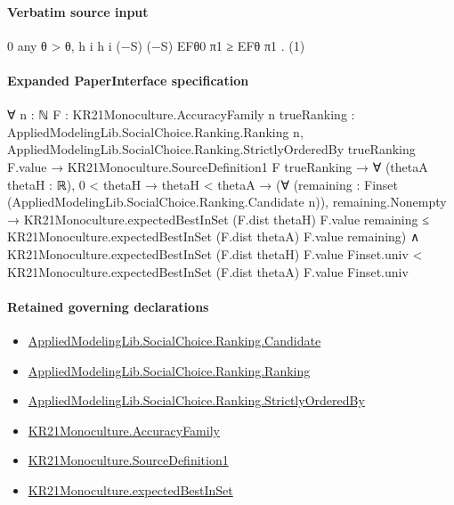 \documentclass[10pt]{article}
\begin{document}
\paragraph{Verbatim source input}
\begin{ReviewVerbatim}
0
any θ > θ,
h
i
h
i
(−S)
(−S)
EFθ0 π1
≥ EFθ π1
.
(1)
\end{ReviewVerbatim}



\paragraph{Expanded PaperInterface specification}
\begin{ReviewVerbatim}
∀ {n : ℕ} {F : KR21Monoculture.AccuracyFamily n} {trueRanking : AppliedModelingLib.SocialChoice.Ranking.Ranking n},
  AppliedModelingLib.SocialChoice.Ranking.StrictlyOrderedBy trueRanking F.value →
    KR21Monoculture.SourceDefinition1 F trueRanking →
      ∀ (thetaA thetaH : ℝ),
        0 < thetaH →
          thetaH < thetaA →
            (∀ (remaining : Finset (AppliedModelingLib.SocialChoice.Ranking.Candidate n)),
                remaining.Nonempty →
                  KR21Monoculture.expectedBestInSet (F.dist thetaH) F.value remaining ≤
                    KR21Monoculture.expectedBestInSet (F.dist thetaA) F.value remaining) ∧
              KR21Monoculture.expectedBestInSet (F.dist thetaH) F.value Finset.univ <
                KR21Monoculture.expectedBestInSet (F.dist thetaA) F.value Finset.univ
\end{ReviewVerbatim}

\paragraph{Retained governing declarations}
\begin{itemize}\raggedright
\item \hyperlink{library-prerequisite-8c0e6c25845ae78a}{Applied\allowbreak{}Modeling\allowbreak{}Lib.\allowbreak{}Social\allowbreak{}Choice.\allowbreak{}Ranking.\allowbreak{}Candidate}
\item \hyperlink{library-prerequisite-5cde54446d1ae021}{Applied\allowbreak{}Modeling\allowbreak{}Lib.\allowbreak{}Social\allowbreak{}Choice.\allowbreak{}Ranking.\allowbreak{}Ranking}
\item \hyperlink{library-prerequisite-3585717d1635654a}{Applied\allowbreak{}Modeling\allowbreak{}Lib.\allowbreak{}Social\allowbreak{}Choice.\allowbreak{}Ranking.\allowbreak{}Strictly\allowbreak{}Ordered\allowbreak{}By}
\item \hyperlink{paper-prerequisite-a1353b2b1b6f0303}{KR21\allowbreak{}Monoculture.\allowbreak{}Accuracy\allowbreak{}Family}
\item \hyperlink{governing-declaration-c8abe471c1270cda}{KR21\allowbreak{}Monoculture.\allowbreak{}Source\allowbreak{}Definition1}
\item \hyperlink{paper-prerequisite-b8698660538f90e1}{KR21\allowbreak{}Monoculture.\allowbreak{}expected\allowbreak{}Best\allowbreak{}In\allowbreak{}Set}
\end{itemize}
\end{document}
